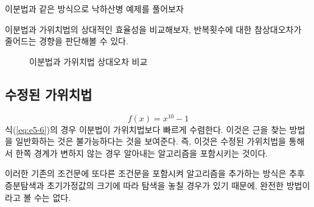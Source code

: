 이분법과 같은 방식으로 낙하산병 예제를 풀어보자

이분법과 가위치법의 상대적인 효율성을 비교해보자, 반복횟수에 대한 참상대오차가 줄어드는 경향을 판단해볼 수 있다.
\begin{figure}[!hbpt]
\centering
{}
\caption{이분법과 가위치법 상대오차 비교}
\label{fig:5-12}
\end{figure}
\subsection{수정된 가위치법}
\begin{equation}\label{eq:e5-6}
f(x)=x^{10}-1
\end{equation}
식(\ref{eq:e5-6})의 경우 이분법이 가위치법보다 빠르게 수렴한다. 이것은 근을 찾는 방법을 일반화하는 것은 불가능하다는 것을 보여준다. 즉, 이것은 수정된 가위치법을 통해서 한쪽 경계가 변하지 않는 경우 알아내는 알고리즘을 포함시키는 것이다. 

이러한 기존의 조건문에 또다른 조건문을 포함시켜 알고리즘을 추가하는 방식은 추후 증분탐색과 초기가정값의 크기에 따라 탐색을 놓칠 경우가 있기 때문에, 완전한 방법이라고 볼 수는 없다.


